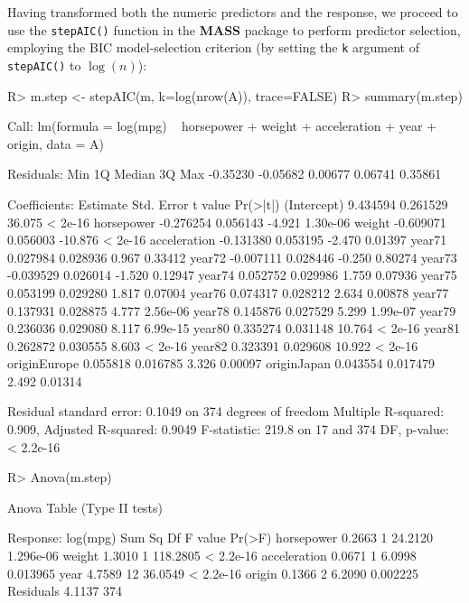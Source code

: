 \documentclass[
]{jss}
\begin{document}
Having transformed both the numeric predictors and the response, we
proceed to use the \texttt{stepAIC()} function in the \textbf{MASS}
package to perform predictor selection, employing the BIC
model-selection criterion (by setting the \texttt{k} argument of
\texttt{stepAIC()} to \(\log(n)\)):

\begin{CodeChunk}
\begin{CodeInput}
R> m.step <- stepAIC(m, k=log(nrow(A)), trace=FALSE)
R> summary(m.step)
\end{CodeInput}
\begin{CodeOutput}

Call:
lm(formula = log(mpg) ~ horsepower + weight + acceleration + 
    year + origin, data = A)

Residuals:
     Min       1Q   Median       3Q      Max 
-0.35230 -0.05682  0.00677  0.06741  0.35861 

Coefficients:
              Estimate Std. Error t value Pr(>|t|)
(Intercept)   9.434594   0.261529  36.075  < 2e-16
horsepower   -0.276254   0.056143  -4.921 1.30e-06
weight       -0.609071   0.056003 -10.876  < 2e-16
acceleration -0.131380   0.053195  -2.470  0.01397
year71        0.027984   0.028936   0.967  0.33412
year72       -0.007111   0.028446  -0.250  0.80274
year73       -0.039529   0.026014  -1.520  0.12947
year74        0.052752   0.029986   1.759  0.07936
year75        0.053199   0.029280   1.817  0.07004
year76        0.074317   0.028212   2.634  0.00878
year77        0.137931   0.028875   4.777 2.56e-06
year78        0.145876   0.027529   5.299 1.99e-07
year79        0.236036   0.029080   8.117 6.99e-15
year80        0.335274   0.031148  10.764  < 2e-16
year81        0.262872   0.030555   8.603  < 2e-16
year82        0.323391   0.029608  10.922  < 2e-16
originEurope  0.055818   0.016785   3.326  0.00097
originJapan   0.043554   0.017479   2.492  0.01314

Residual standard error: 0.1049 on 374 degrees of freedom
Multiple R-squared:  0.909, Adjusted R-squared:  0.9049 
F-statistic: 219.8 on 17 and 374 DF,  p-value: < 2.2e-16
\end{CodeOutput}
\begin{CodeInput}
R> Anova(m.step)
\end{CodeInput}
\begin{CodeOutput}
Anova Table (Type II tests)

Response: log(mpg)
             Sum Sq  Df  F value    Pr(>F)
horsepower   0.2663   1  24.2120 1.296e-06
weight       1.3010   1 118.2805 < 2.2e-16
acceleration 0.0671   1   6.0998  0.013965
year         4.7589  12  36.0549 < 2.2e-16
origin       0.1366   2   6.2090  0.002225
Residuals    4.1137 374                   
\end{CodeOutput}
\end{CodeChunk}
\end{document}
